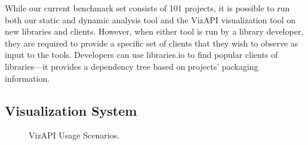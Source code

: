 While our current benchmark set consists of 101 projects, it is possible to run both our static and dynamic analysis tool and the VizAPI visualization tool on new libraries and clients. However, when either tool is run by a library developer, they are required to provide a specific set of clients that they wish to observe as input to the tools. Developers can use libraries.io to find popular clients of libraries---it provides a dependency tree based on projects' packaging information.


\subsection{Visualization System}
\label{subsec:vis-system}

\begin{figure}[h]
\begin{center}

\hspace{7mm}

\caption{\label{fig:usagescenarios} VizAPI Usage Scenarios.}

\end{center}
\end{figure}


